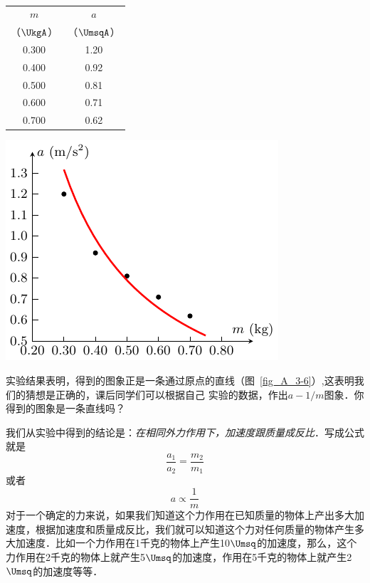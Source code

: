 \begin{table}[htbp]
	\centering
	\begin{minipage}[b]{0.45\linewidth}
		\centering
		\begin{tabular}{cc}
			\hline
			$m$  & $a$ \\
			（$\UkgA$）&（$\UmsqA$）\\
			\hline
			0.300  &  1.20  \\
			0.400  &  0.92  \\
			0.500  &  0.81  \\
			0.600  &  0.71  \\
			0.700  &  0.62  \\
			\hline
		\end{tabular}
		\caption{}\label{tab_A_3-2}
	\end{minipage}
	\hfil
	\begin{minipage}[b]{0.45\linewidth}
		\centering
		\includegraphics{fig/A/3-5.pdf}
		\label{fig_A_3-5}
	\end{minipage}
\end{table}




实验结果表明，得到的图象正是一条通过原点的直线（图~\ref{fig_A_3-6}）,这表明我们的猜想是正确的，课后同学们可以根据自己
实验的数据，作出$a-1/m$图象．你得到的图象是一条直线吗？


我们从实验中得到的结论是：\textit{在相同外力作用下，加速度跟质量成反比}．写成公式就是
\[\frac{a_1}{a_2}=\frac{m_2}{m_1} \]
或者
\[a\propto \frac{1}{m} \]
对于一个确定的力来说，如果我们知道这个力作用在已知质量的物体上产出多大加速度，根据加速度和质量成反比，我们就可以知道这个力对任何质量的物体产生多大加速度．比如一个力作用在1千克的物体上产生10$\Umsq$的加速度，那么，这个力作用在2千克的物体上就产生5$\Umsq$的加速度，作用在5千克的物体上就产生2$\Umsq$的加速度等等．




